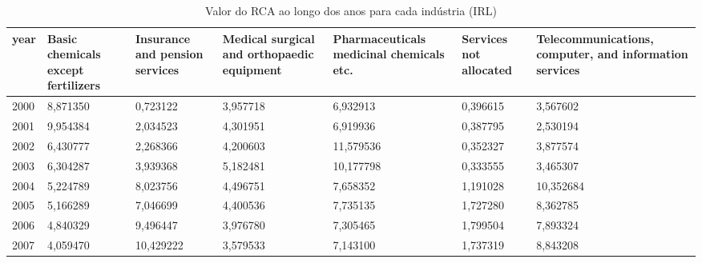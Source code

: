 \begin{table}
\centering
\caption{Valor do RCA ao longo dos anos para cada indústria (IRL)}
\begin{tabular}{p{1cm}p{2cm}p{2cm}p{2cm}p{2cm}p{2cm}p{2cm}}
\toprule
 year &  Basic chemicals except fertilizers &  Insurance and pension services &  Medical surgical and orthopaedic equipment &  Pharmaceuticals medicinal chemicals etc. &  Services not allocated &  Telecommunications, computer, and information services \\
\midrule
 2000 &                            8,871350 &                        0,723122 &                                    3,957718 &                                  6,932913 &                0,396615 &                                           3,567602 \\
 2001 &                            9,954384 &                        2,034523 &                                    4,301951 &                                  6,919936 &                0,387795 &                                           2,530194 \\
 2002 &                            6,430777 &                        2,268366 &                                    4,200603 &                                 11,579536 &                0,352327 &                                           3,877574 \\
 2003 &                            6,304287 &                        3,939368 &                                    5,182481 &                                 10,177798 &                0,333555 &                                           3,465307 \\
 2004 &                            5,224789 &                        8,023756 &                                    4,496751 &                                  7,658352 &                1,191028 &                                          10,352684 \\
 2005 &                            5,166289 &                        7,046699 &                                    4,400536 &                                  7,735135 &                1,727280 &                                           8,362785 \\
 2006 &                            4,840329 &                        9,496447 &                                    3,976780 &                                  7,305465 &                1,799504 &                                           7,893324 \\
 2007 &                            4,059470 &                       10,429222 &                                    3,579533 &                                  7,143100 &                1,737319 &                                           8,843208 \\

\end{tabular}
\end{table}

